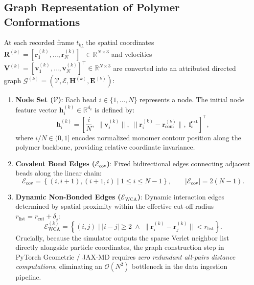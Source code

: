 \documentclass[12pt,a4paper]{article}
\newcommand{\Obig}[1]{\mathcal{O}\!\left(#1\right)}
\begin{document}
\subsection{Graph Representation of Polymer Conformations}
\label{sec:graph-rep}

At each recorded frame $t_k$, the spatial coordinates $\mathbf{R}^{(k)} = [\mathbf{r}_1^{(k)}, \ldots, \mathbf{r}_N^{(k)}]^\top \in \mathbb{R}^{N \times 3}$ and velocities $\mathbf{V}^{(k)} = [\mathbf{v}_1^{(k)}, \ldots, \mathbf{v}_N^{(k)}]^\top \in \mathbb{R}^{N \times 3}$ are converted into an attributed directed graph $\mathcal{G}^{(k)} = (\mathcal{V}, \mathcal{E}, \mathbf{H}^{(k)}, \mathbf{E}^{(k)})$:
\begin{enumerate}[label=\alph*)]
  \item \textbf{Node Set ($\mathcal{V}$)}: Each bead $i \in \{1, \ldots, N\}$ represents a node. The initial node feature vector $\mathbf{h}_i^{(k)} \in \mathbb{R}^{d_v}$ is defined by:
    \begin{equation}
      \mathbf{h}_i^{(k)} = \left[ \frac{i}{N},\; \|\mathbf{v}_i^{(k)}\|,\; \|\mathbf{r}_i^{(k)} - \mathbf{r}_\text{com}^{(k)}\|,\; \mathbf{f}_i^\text{ext} \right]^\top,
    \end{equation}
    where $i/N \in (0, 1]$ encodes normalized monomer contour position along the polymer backbone, providing relative coordinate invariance.

  \item \textbf{Covalent Bond Edges ($\mathcal{E}_\text{cov}$)}: Fixed bidirectional edges connecting adjacent beads along the linear chain:
    \begin{equation}
      \mathcal{E}_\text{cov} = \left\{(i, i+1), (i+1, i) \mid 1 \leq i \leq N-1\right\}, \qquad |\mathcal{E}_\text{cov}| = 2(N-1).
    \end{equation}

  \item \textbf{Dynamic Non-Bonded Edges ($\mathcal{E}_\text{WCA}$)}: Dynamic interaction edges determined by spatial proximity within the effective cut-off radius $r_\text{list} = r_\text{cut} + \delta_s$:
    \begin{equation}
      \mathcal{E}_\text{WCA}^{(k)} = \left\{(i, j) \mid |i - j| \geq 2 \;\land\; \|\mathbf{r}_i^{(k)} - \mathbf{r}_j^{(k)}\| < r_\text{list}\right\}.
    \end{equation}
    Crucially, because the simulator outputs the sparse Verlet neighbor list directly alongside particle coordinates, the graph construction step in PyTorch Geometric / JAX-MD requires \emph{zero redundant all-pairs distance computations}, eliminating an $\Obig{N^2}$ bottleneck in the data ingestion pipeline.


\end{enumerate}
\end{document}
